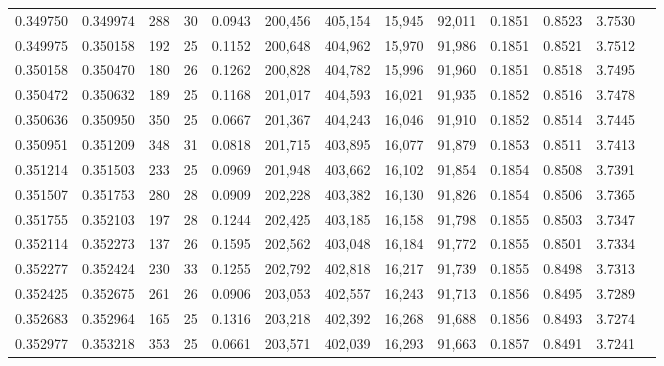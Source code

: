 \begin{tabular}{rrrrrrrrrrrrr}
0.349750 & 0.349974 &   288 &  30 &                                     0.0943 & 200,456 & 405,154 &  15,945 &  92,011 & 0.1851 & 0.8523 & 3.7530 \\
0.349975 & 0.350158 &   192 &  25 &                                     0.1152 & 200,648 & 404,962 &  15,970 &  91,986 & 0.1851 & 0.8521 & 3.7512 \\
0.350158 & 0.350470 &   180 &  26 &                                     0.1262 & 200,828 & 404,782 &  15,996 &  91,960 & 0.1851 & 0.8518 & 3.7495 \\
0.350472 & 0.350632 &   189 &  25 &                                     0.1168 & 201,017 & 404,593 &  16,021 &  91,935 & 0.1852 & 0.8516 & 3.7478 \\
0.350636 & 0.350950 &   350 &  25 &                                     0.0667 & 201,367 & 404,243 &  16,046 &  91,910 & 0.1852 & 0.8514 & 3.7445 \\
0.350951 & 0.351209 &   348 &  31 &                                     0.0818 & 201,715 & 403,895 &  16,077 &  91,879 & 0.1853 & 0.8511 & 3.7413 \\
0.351214 & 0.351503 &   233 &  25 &                                     0.0969 & 201,948 & 403,662 &  16,102 &  91,854 & 0.1854 & 0.8508 & 3.7391 \\
0.351507 & 0.351753 &   280 &  28 &                                     0.0909 & 202,228 & 403,382 &  16,130 &  91,826 & 0.1854 & 0.8506 & 3.7365 \\
0.351755 & 0.352103 &   197 &  28 &                                     0.1244 & 202,425 & 403,185 &  16,158 &  91,798 & 0.1855 & 0.8503 & 3.7347 \\
0.352114 & 0.352273 &   137 &  26 &                                     0.1595 & 202,562 & 403,048 &  16,184 &  91,772 & 0.1855 & 0.8501 & 3.7334 \\
0.352277 & 0.352424 &   230 &  33 &                                     0.1255 & 202,792 & 402,818 &  16,217 &  91,739 & 0.1855 & 0.8498 & 3.7313 \\
0.352425 & 0.352675 &   261 &  26 &                                     0.0906 & 203,053 & 402,557 &  16,243 &  91,713 & 0.1856 & 0.8495 & 3.7289 \\
0.352683 & 0.352964 &   165 &  25 &                                     0.1316 & 203,218 & 402,392 &  16,268 &  91,688 & 0.1856 & 0.8493 & 3.7274 \\
0.352977 & 0.353218 &   353 &  25 &                                     0.0661 & 203,571 & 402,039 &  16,293 &  91,663 & 0.1857 & 0.8491 & 3.7241 \\

\end{tabular}

